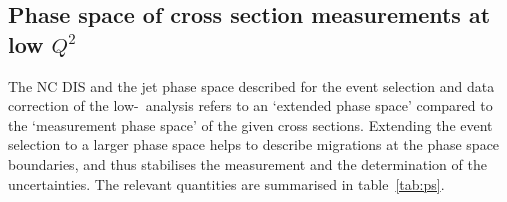 \documentclass[12pt]{article}
\begin{document}
\begin{boldmath}
\subsection{Phase space of cross section measurements at low $Q^2$}
\label{sec:pslow}
\end{boldmath}

The NC DIS and the jet phase space described for the event selection and data correction of the low-\Qsq\ analysis
refers to an `extended phase space' compared to the `measurement phase space' of the given cross sections. 
Extending the event selection to a larger phase space helps to describe 
migrations at the phase space boundaries, and thus stabilises the measurement and the 
determination of the uncertainties. The relevant quantities are summarised in table~\ref{tab:ps}.
\end{document}
